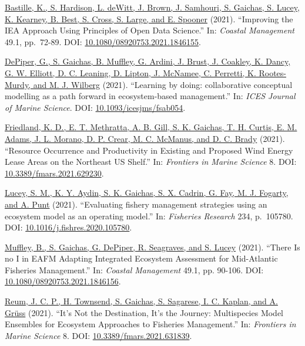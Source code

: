 \documentclass[11pt, a4paper]{awesome-cv}
\begin{document}
\protect\hyperlink{cite-bastille_improving_2021}{Bastille, K., S.
Hardison, L. deWitt, J. Brown, J. Samhouri, S. Gaichas, S. Lucey, K.
Kearney, B. Best, S. Cross, S. Large, and E. Spooner} (2021).
``Improving the IEA Approach Using Principles of Open Data Science.''
In: \emph{Coastal Management} 49.1, pp.~72-89. DOI:
\href{https://doi.org/10.1080\%2F08920753.2021.1846155}{10.1080/08920753.2021.1846155}.

\protect\hyperlink{cite-depiper_learning_2021}{DePiper, G., S. Gaichas,
B. Muffley, G. Ardini, J. Brust, J. Coakley, K. Dancy, G. W. Elliott, D.
C. Leaning, D. Lipton, J. McNamee, C. Perretti, K. Rootes-Murdy, and M.
J. Wilberg} (2021). ``Learning by doing: collaborative conceptual
modelling as a path forward in ecosystem-based management.'' In:
\emph{ICES Journal of Marine Science}. DOI:
\href{https://doi.org/10.1093\%2Ficesjms\%2Ffsab054}{10.1093/icesjms/fsab054}.

\protect\hyperlink{cite-friedland_resource_2021}{Friedland, K. D., E. T.
Methratta, A. B. Gill, S. K. Gaichas, T. H. Curtis, E. M. Adams, J. L.
Morano, D. P. Crear, M. C. McManus, and D. C. Brady} (2021). ``Resource
Occurrence and Productivity in Existing and Proposed Wind Energy Lease
Areas on the Northeast US Shelf.'' In: \emph{Frontiers in Marine
Science} 8. DOI:
\href{https://doi.org/10.3389\%2Ffmars.2021.629230}{10.3389/fmars.2021.629230}.

\protect\hyperlink{cite-lucey_evaluating_2021}{Lucey, S. M., K. Y.
Aydin, S. K. Gaichas, S. X. Cadrin, G. Fay, M. J. Fogarty, and A. Punt}
(2021). ``Evaluating fishery management strategies using an ecosystem
model as an operating model.'' In: \emph{Fisheries Research} 234,
p.~105780. DOI:
\href{https://doi.org/10.1016\%2Fj.fishres.2020.105780}{10.1016/j.fishres.2020.105780}.

\protect\hyperlink{cite-muffley_there_2021}{Muffley, B., S. Gaichas, G.
DePiper, R. Seagraves, and S. Lucey} (2021). ``There Is no I in EAFM
Adapting Integrated Ecosystem Assessment for Mid-Atlantic Fisheries
Management.'' In: \emph{Coastal Management} 49.1, pp. 90-106. DOI:
\href{https://doi.org/10.1080\%2F08920753.2021.1846156}{10.1080/08920753.2021.1846156}.

\protect\hyperlink{cite-reum_its_2021}{Reum, J. C. P., H. Townsend, S.
Gaichas, S. Sagarese, I. C. Kaplan, and A. Grüss} (2021). ``It's Not the
Destination, It's the Journey: Multispecies Model Ensembles for
Ecosystem Approaches to Fisheries Management.'' In: \emph{Frontiers in
Marine Science} 8. DOI:
\href{https://doi.org/10.3389\%2Ffmars.2021.631839}{10.3389/fmars.2021.631839}.
\end{document}

